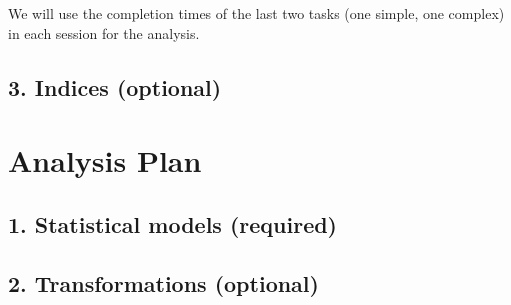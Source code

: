 \documentclass[A4,11pt]{article}
\renewcommand{\~}[1]{\tilde{#1}}
\renewcommand{\-}[1]{\overline{#1}}
\begin{document}
We will use the completion times of the last two tasks (one simple, one complex) in each session for the analysis.

\subsection*{3. Indices (optional) }

\newpage   

\section*{Analysis Plan}



\subsection*{1. Statistical models (required) }



 
\subsection*{2. Transformations (optional)}
\end{document}
